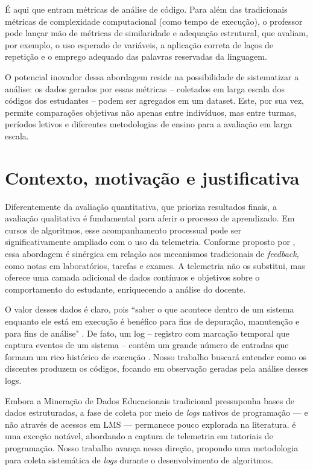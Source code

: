É aqui que entram métricas de análise de código. Para além das tradicionais métricas de complexidade 
computacional (como tempo de execução), o professor pode lançar mão de métricas de similaridade e 
adequação estrutural, que avaliam, por exemplo, o uso esperado de variáveis, a aplicação correta de laços de 
repetição e o emprego adequado das palavras reservadas da linguagem. 

O potencial inovador dessa abordagem reside na possibilidade de sistematizar a análise: os dados gerados por 
essas métricas -- coletados em larga escala dos códigos dos estudantes -- podem ser agregados em um dataset. 
Este, por sua vez, permite comparações objetivas não apenas entre indivíduos, mas entre turmas, períodos 
letivos e diferentes metodologias de ensino para a avaliação em larga escala. 


\section{Contexto, motivação e justificativa}\label{sec:consideracoesIniciais}

Diferentemente da avaliação quantitativa, que prioriza resultados finais, a avaliação qualitativa é fundamental 
para aferir o processo de aprendizado. Em cursos de algoritmos, esse acompanhamento processual pode ser 
significativamente ampliado com o uso da telemetria. Conforme proposto por \cite{russo2015towards}, essa 
abordagem é sinérgica em relação aos mecanismos tradicionais de \textit{feedback}, como notas em laboratórios, 
tarefas e exames. A telemetria não os substitui, mas oferece uma camada adicional de dados contínuos e 
objetivos sobre o comportamento do estudante, enriquecendo a análise do docente.

O valor desses dados é claro, pois ``saber o que acontece dentro de um sistema enquanto ele está em execução é 
benéfico para fins de depuração, manutenção e para fins de análise" \cite{Gatev2021}. De fato, um log -- 
registro com marcação temporal que captura eventos de um sistema -- contém um grande número de entradas que 
formam um rico histórico de execução \cite{gu2022logging}. Nosso trabalho buscará entender como os discentes 
produzem os códigos, focando em observação geradas pela análise desses logs.

Embora a Mineração de Dados Educacionais tradicional pressuponha bases de dados estruturadas, a fase de coleta 
por meio de \textit{logs} nativos de programação — e não através de acessos em LMS — permanece pouco explorada 
na literatura. \cite{kennedy2015towards} é uma exceção notável, abordando a captura de telemetria em tutoriais 
de programação. Nosso trabalho avança nessa direção, propondo uma metodologia para coleta sistemática de 
\textit{logs} durante o desenvolvimento de algoritmos.

